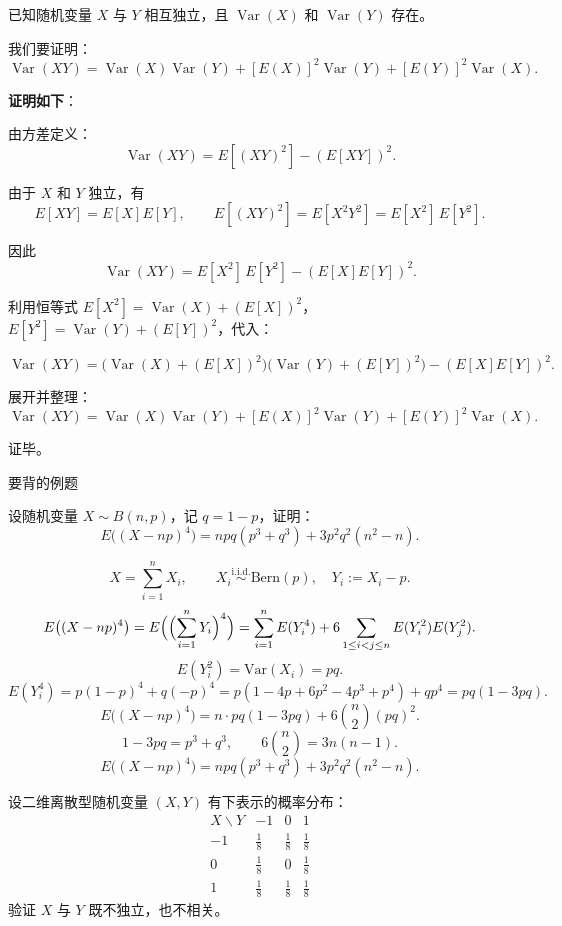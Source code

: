 \begin{solution}
已知随机变量 $X$ 与 $Y$ 相互独立，且 $\operatorname{Var}(X)$ 和 $\operatorname{Var}(Y)$ 存在。

我们要证明：
\[
\operatorname{Var}(XY)
= \operatorname{Var}(X)\operatorname{Var}(Y)
+ [E(X)]^2 \operatorname{Var}(Y)
+ [E(Y)]^2 \operatorname{Var}(X).
\]

\textbf{证明如下}：

由方差定义：
\[
\operatorname{Var}(XY) = E\!\left[(XY)^2\right] - \left(E[XY]\right)^2.
\]

由于 $X$ 和 $Y$ 独立，有
\[
E[XY] = E[X]E[Y],
\qquad
E\!\left[(XY)^2\right] = E[X^2Y^2] = E[X^2]\,E[Y^2].
\]

因此
\[
\operatorname{Var}(XY)
= E[X^2]\,E[Y^2] - (E[X]E[Y])^2.
\]

利用恒等式 $E[X^2] = \operatorname{Var}(X) + (E[X])^2$，$E[Y^2] = \operatorname{Var}(Y) + (E[Y])^2$，代入：

\[
\operatorname{Var}(XY)
= \big( \operatorname{Var}(X) + (E[X])^2 \big)
  \big( \operatorname{Var}(Y) + (E[Y])^2 \big)
  - (E[X]E[Y])^2.
\]

展开并整理：
\[
\boxed{
\operatorname{Var}(XY)
= \operatorname{Var}(X)\operatorname{Var}(Y)
+ [E(X)]^2 \operatorname{Var}(Y)
+ [E(Y)]^2 \operatorname{Var}(X)
}.
\]

证毕。
\end{solution}
\begin{dxtips}
    要背的例题
\end{dxtips}
\begin{homework}[3.24]
设随机变量 $X \sim B(n, p)$，记 $q = 1 - p$，证明：
\[
E\bigl((X - np)^4\bigr)
= npq(p^3 + q^3) + 3p^2 q^2(n^2 - n).
\]
\end{homework}
\begin{solution}
\[
X=\sum_{i=1}^n X_i,\qquad X_i\overset{\mathrm{i.i.d.}}{\sim}\mathrm{Bern}(p),\quad Y_i:=X_i-p.
\]
\[
E\bigl((X-np)^4\bigr)
=E\Bigl(\Bigl(\sum_{i=1}^n Y_i\Bigr)^4\Bigr)
=\sum_{i=1}^n E(Y_i^4)+6\sum_{1\le i<j\le n}E(Y_i^2)E(Y_j^2).
\]
\[
E(Y_i^2)=\mathrm{Var}(X_i)=pq.
\]
\[
E(Y_i^4)=p(1-p)^4+q(-p)^4
= p(1-4p+6p^2-4p^3+p^4)+qp^4
= pq(1-3pq).
\]
\[
E\bigl((X-np)^4\bigr)=n\cdot pq(1-3pq)+6\binom{n}{2}(pq)^2.
\]
\[
1-3pq=p^3+q^3,\qquad 6\binom{n}{2}=3n(n-1).
\]
\[
\boxed{\,E\bigl((X-np)^4\bigr)=npq(p^3+q^3)+3p^2q^2(n^2-n).\,}
\]
\end{solution}
\begin{homework}[3.25]
设二维离散型随机变量 $(X, Y)$ 有下表示的概率分布：
\[
\begin{array}{c|ccc}
X \backslash Y & -1 & 0 & 1 \\ \hline
-1 & \tfrac{1}{8} & \tfrac{1}{8} & \tfrac{1}{8} \\
0  & \tfrac{1}{8} & 0           & \tfrac{1}{8} \\
1  & \tfrac{1}{8} & \tfrac{1}{8} & \tfrac{1}{8}
\end{array}
\]
验证 $X$ 与 $Y$ 既不独立，也不相关。
\end{homework}
